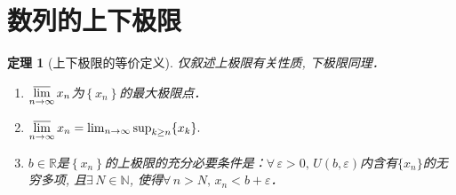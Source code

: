 \documentclass[11pt,a4paper]{ctexart}
\makeatletter
\theoremstyle{thmseries} %
\newtheorem{thm}{定理}[section]
\theoremstyle{exerseries}
\newtheorem{exer}{习题}[section]
\renewenvironment{proof}[1][\proofname]{\par
  \pushQED{\qed}%
  \normalfont \topsep6\p@\@plus6\p@\relax
  \trivlist
  \item[\hskip\labelsep
        \itshape
    #1\@addpunct{}]\ignorespaces
}{%
  \popQED\endtrivlist\@endpefalse
}
\newenvironment{pf}{\begin{proof}[\bfseries\upshape 证\quad]}{\end{proof}}
\newcommand{\bra}[1]{\mathopen{}\left(#1\right)}
\newcommand{\sbra}[1]{\mathopen{}\left[#1\right]}
\newcommand{\cbra}[1]{\mathopen{}\left\{#1\right\}}
\renewcommand{\epsilon}{\varepsilon}
\newcommand{\R}{\mathbb{R}}
\newcommand{\N}{\mathbb{N}}
\def \nti {\mathnormal{n}\to\infty}
\DeclareMathOperator{\ulim}{\underset{\nti}{\overline{\lim}}}
\makeatother
\begin{document}




\section{数列的上下极限}
\begin{thm}[上下极限的等价定义]
仅叙述上极限有关性质, 下极限同理．
\begin{enumerate}
	\item $\ulim x_n$为$\cbra{x_n}$的最大极限点．
	\item $\ulim x_n=\lim_{n\to\infty}\sup_{k\geq n}\{x_k\}.$
	\item $b\in\R$是$\cbra{x_n}$的上极限的充分必要条件是：$\forall\,\epsilon>0,\,U\bra{b,\epsilon}$内含有$\{x_n\}$的无穷多项, 且$\exists\,N\in\N$, 使得$\forall\,n>N,\,x_n<b+\epsilon$．
\end{enumerate}
\end{thm}
\end{document}
